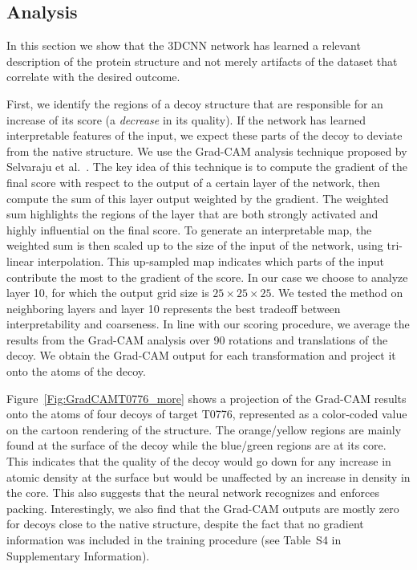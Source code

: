 \documentclass{bioinfo}
\begin{document}
\subsection{Analysis}

In this section we show that the 3DCNN network has learned a relevant
description of the protein structure and not merely artifacts of the
dataset that correlate with the desired outcome.

First, we identify the regions of a decoy structure that are
responsible for an increase of its score (a \emph{decrease} in its
quality). If the network has learned interpretable features of the
input, we expect these parts of the decoy to deviate from the native
structure.
%
We use the Grad-CAM analysis technique proposed by Selvaraju et
al.~\citep{selvaraju2016grad}. The key idea of this technique is to
compute the gradient of the final score with respect to the output of
a certain layer of the network, then compute the sum of this layer
output weighted by the gradient.
%
The weighted sum highlights the regions of the layer that are both
strongly activated and highly influential on the final score. To
generate an interpretable map, the weighted sum is then scaled up to
the size of the input of the network, using tri-linear interpolation.
%
This up-sampled map indicates which parts of the input contribute
the most to the gradient of the score.  In our case we choose to
analyze layer 10, for which the output grid size is $25\times 25\times
25$.  We tested the method on neighboring layers and
layer 10 represents the best tradeoff between interpretability and
coarseness.
%
In line with our scoring procedure, we average the results
from the Grad-CAM analysis over 90 rotations and translations of the
decoy. We obtain the Grad-CAM output for each transformation and
project it onto the atoms of the decoy.  

Figure~\ref{Fig:GradCAMT0776_more} shows a projection of the Grad-CAM
results onto the atoms of four decoys of target T0776, represented as
a color-coded value on the cartoon rendering of the structure.  The
orange/yellow regions are mainly found at the surface of the decoy
while the blue/green regions are at its core. This indicates that the
quality of the decoy would go down for any increase in atomic density
at the surface but would be unaffected by an increase in density in
the core. This also suggests that the neural network recognizes and
enforces packing.  Interestingly, we also find that the Grad-CAM
outputs are mostly zero for decoys close to the native structure,
despite the fact that no gradient information was included in the
training procedure (see Table~S4 in Supplementary Information).
\end{document}
